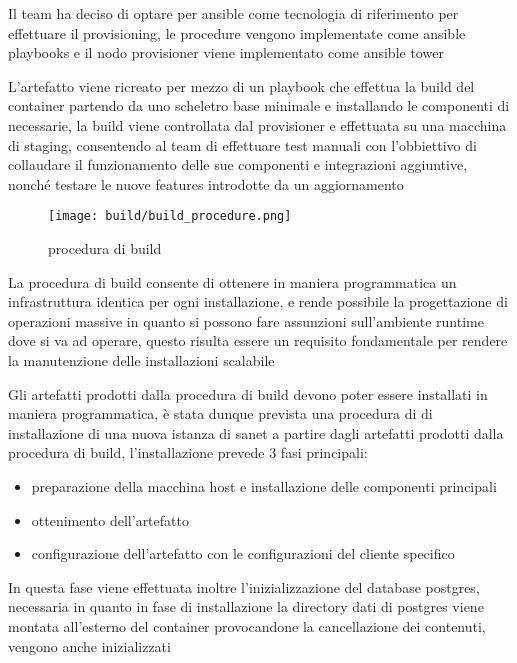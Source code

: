 Il team ha deciso di optare per ansible\cite{ansible} come tecnologia di riferimento per effettuare il provisioning, le procedure vengono implementate come ansible playbooks e il nodo provisioner viene implementato come ansible tower

L'artefatto viene ricreato per mezzo di un playbook che effettua la build del container partendo da uno scheletro base minimale e installando le componenti di necessarie, la build viene controllata dal provisioner e effettuata su una macchina di staging, consentendo al team di effettuare test manuali con l'obbiettivo di collaudare il funzionamento delle sue componenti e integrazioni aggiuntive, nonché testare le nuove features introdotte da un aggiornamento

\begin{figure}[H]
    \centering
    \texttt{[image: build/build\_procedure.png]}
    \caption{procedura di build}
    \label{fig:enter-label}
\end{figure}

La procedura di build consente di ottenere in maniera programmatica un infrastruttura identica per ogni installazione, e rende possibile la progettazione di operazioni massive in quanto si possono fare assunzioni sull'ambiente runtime dove si va ad operare, questo risulta essere un requisito fondamentale per rendere la manutenzione delle installazioni scalabile

Gli artefatti prodotti dalla procedura di build devono poter essere installati in maniera programmatica, è stata dunque prevista una procedura di di installazione di una nuova istanza di sanet a partire dagli artefatti prodotti dalla procedura di build, l'installazione prevede 3 fasi principali:

\begin{itemize}
  \item{preparazione della macchina host e installazione delle componenti principali}
  \item{ottenimento dell'artefatto}
  \item{configurazione dell'artefatto con le configurazioni del cliente specifico}
\end{itemize}

In questa fase viene effettuata inoltre l'inizializzazione del database postgres, necessaria in quanto in fase di installazione la directory dati di postgres viene montata all'esterno del container provocandone la cancellazione dei contenuti, vengono anche inizializzati

